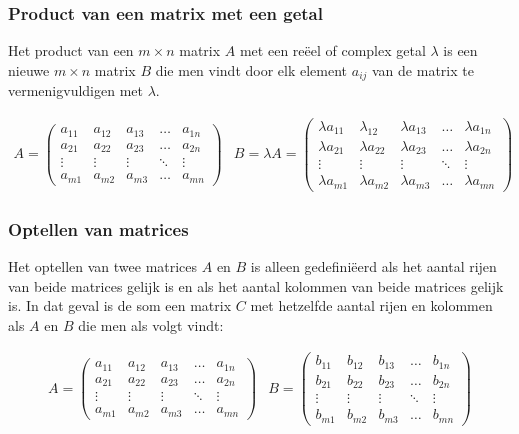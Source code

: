 \subsubsection{Product van een matrix met een getal}
	
Het product van een $m \times n$ matrix $A$ met een re\"{e}el of complex getal $\lambda$ is een nieuwe $m \times n$ matrix $B$ die men vindt door elk element $a_{ij}$ van de matrix te vermenigvuldigen met $\lambda$.
	
\[
\begin{array}{ll}
A= \left( \begin{matrix}
a_{11} & a_{12} & a_{13} & \ldots & a_{1n} \\
a_{21} & a_{22} & a_{23} & \ldots & a_{2n} \\
\vdots & \vdots & \vdots & \ddots & \vdots \\
a_{m1} & a_{m2} & a_{m3} & \ldots & a_{mn}
\end{matrix} \right) &
B=\lambda A=\left( \begin{matrix}
\lambda a_{11} & \lambda_{12} & \lambda a_{13} & \ldots & \lambda a_{1n} \\
\lambda a_{21} & \lambda a_{22} & \lambda a_{23} & \ldots & \lambda a_{2n} \\
\vdots & \vdots & \vdots & \ddots & \vdots \\
\lambda a_{m1} & \lambda a_{m2} & \lambda a_{m3} & \ldots & \lambda a_{mn}
\end{matrix} \right)
\end{array}
\]
	
\subsubsection{Optellen van matrices}

Het optellen van twee matrices $A$ en $B$ is alleen gedefini\"{e}erd als het aantal rijen van beide matrices gelijk is en als het aantal kolommen van beide matrices gelijk is. In dat geval is de som een matrix $C$ met hetzelfde aantal rijen en kolommen als $A$ en $B$ die men als volgt vindt:

\[ 
\begin{array}{ll}
A= \left( \begin{matrix}
a_{11} & a_{12} & a_{13} & \ldots & a_{1n} \\
a_{21} & a_{22} & a_{23} & \ldots & a_{2n} \\
\vdots & \vdots & \vdots & \ddots & \vdots \\
a_{m1} & a_{m2} & a_{m3} & \ldots & a_{mn}
\end{matrix} \right) &
B= \left( \begin{matrix}
b_{11} & b_{12} & b_{13} & \ldots & b_{1n} \\
b_{21} & b_{22} & b_{23} & \ldots & b_{2n} \\
\vdots & \vdots & \vdots & \ddots & \vdots \\
b_{m1} & b_{m2} & b_{m3} & \ldots & b_{mn}
\end{matrix} \right)
\end{array}
\]

